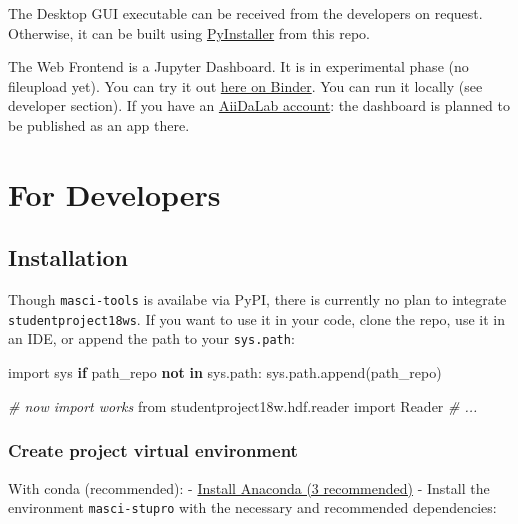 \documentclass[]{article}
\newenvironment{Shaded}{}{}
\newcommand{\KeywordTok}[1]{\textcolor[rgb]{0.00,0.44,0.13}{\textbf{#1}}}
\newcommand{\ImportTok}[1]{#1}
\newcommand{\CommentTok}[1]{\textcolor[rgb]{0.38,0.63,0.69}{\textit{#1}}}
\newcommand{\ControlFlowTok}[1]{\textcolor[rgb]{0.00,0.44,0.13}{\textbf{#1}}}
\newcommand{\NormalTok}[1]{#1}
\begin{document}
The Desktop GUI executable can be received from the developers on
request. Otherwise, it can be built using
\href{https://www.pyinstaller.org/}{PyInstaller} from this repo.

The Web Frontend is a Jupyter Dashboard. It is in experimental phase (no
fileupload yet). You can try it out
\href{https://mybinder.org/v2/gh/JuDFTteam/masci-tools/studentproject18ws?filepath=studentproject18w\%2Ffrontend\%2Fjupyter\%2Fdemo\%2Fbinder_demo.ipynb}{here
on Binder}. You can run it locally (see developer section). If you have
an \href{https://aiidalab.materialscloud.org/hub/login}{AiiDaLab
account}: the dashboard is planned to be published as an app there.

\section{For Developers}\label{for-developers}

\subsection{Installation}\label{installation}

Though \texttt{masci-tools} is availabe via PyPI, there is currently no
plan to integrate \texttt{studentproject18ws}. If you want to use it in
your code, clone the repo, use it in an IDE, or append the path to your
\texttt{sys.path}:

\begin{Shaded}
\begin{Highlighting}[]
\ImportTok{import}\NormalTok{ sys}
\ControlFlowTok{if}\NormalTok{ path_repo }\KeywordTok{not} \KeywordTok{in}\NormalTok{ sys.path:}
\NormalTok{    sys.path.append(path_repo)}
    
\CommentTok{# now import works}
\ImportTok{from}\NormalTok{ studentproject18w.hdf.reader }\ImportTok{import}\NormalTok{ Reader}
\CommentTok{# ...}
\end{Highlighting}
\end{Shaded}

\subsubsection{Create project virtual
environment}\label{create-project-virtual-environment}

With conda (recommended): -
\href{https://www.anaconda.com/download}{Install Anaconda (3
recommended)} - Install the environment \texttt{masci-stupro} with the
necessary and recommended dependencies:
\end{document}
